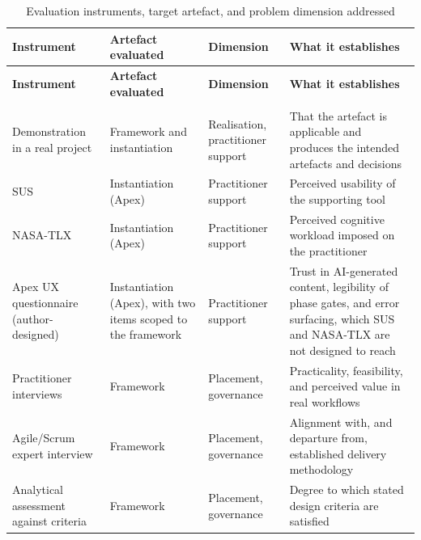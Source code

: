 {\small
\setlength{\tabcolsep}{5pt}
\begin{longtable}{>{\raggedright\arraybackslash}p{4.0cm}
                  >{\raggedright\arraybackslash}p{2.8cm}
                  >{\raggedright\arraybackslash}p{2.4cm}
                  >{\raggedright\arraybackslash}p{4.6cm}}
\caption{Evaluation instruments, target artefact, and problem dimension addressed}
\label{tab:eval_instruments} \\
\toprule
\textbf{Instrument} & \textbf{Artefact evaluated} & \textbf{Dimension} & \textbf{What it establishes} \\
\midrule
\endfirsthead
\toprule
\textbf{Instrument} & \textbf{Artefact evaluated} & \textbf{Dimension} & \textbf{What it establishes} \\
\midrule
\endhead
\midrule
\multicolumn{4}{r}{\textit{Continued on next page}}\\
\bottomrule
\endfoot
\bottomrule
\endlastfoot

Demonstration in a real project & Framework and instantiation & Realisation, practitioner support & That the artefact is applicable and produces the intended artefacts and decisions \\
\addlinespace

\ac{SUS} & Instantiation (Apex) & Practitioner support & Perceived usability of the supporting tool \\
\addlinespace

\ac{NASA-TLX} & Instantiation (Apex) & Practitioner support & Perceived cognitive workload imposed on the practitioner \\
\addlinespace

Apex \ac{UX} questionnaire (author-designed) & Instantiation (Apex), with two items scoped to the framework & Practitioner support & Trust in AI-generated content, legibility of phase gates, and error surfacing, which \ac{SUS} and \ac{NASA-TLX} are not designed to reach \\
\addlinespace

Practitioner interviews & Framework & Placement, governance & Practicality, feasibility, and perceived value in real workflows \\
\addlinespace

Agile/Scrum expert interview & Framework & Placement, governance & Alignment with, and departure from, established delivery methodology \\
\addlinespace

Analytical assessment against criteria & Framework & Placement, governance & Degree to which stated design criteria are satisfied \\
\end{longtable}
}

